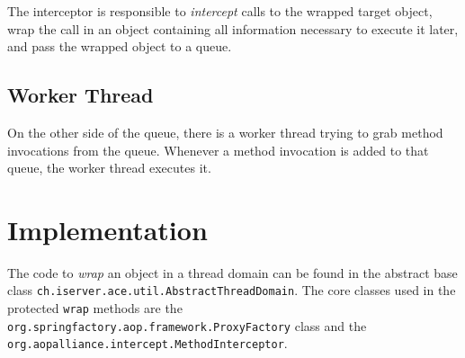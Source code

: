 The interceptor is responsible to \emph{intercept} calls to the wrapped
target object, wrap the call in an object containing all information 
necessary to execute it later, and pass the wrapped object to a queue.

\subsection{Worker Thread}
On the other side of the queue, there is a worker thread trying to grab
method invocations from the queue. Whenever a method invocation is added
to that queue, the worker thread executes it.



\section{Implementation}

The code to \emph{wrap} an object in a thread domain can be found in the
abstract base class \texttt{ch.iserver.ace.util.AbstractThreadDomain}. The
core classes used in the protected \texttt{wrap} methods are the
\texttt{org.springfactory.aop.framework.ProxyFactory} class and the 
\texttt{org.aopalliance.intercept.MethodInterceptor}. 

